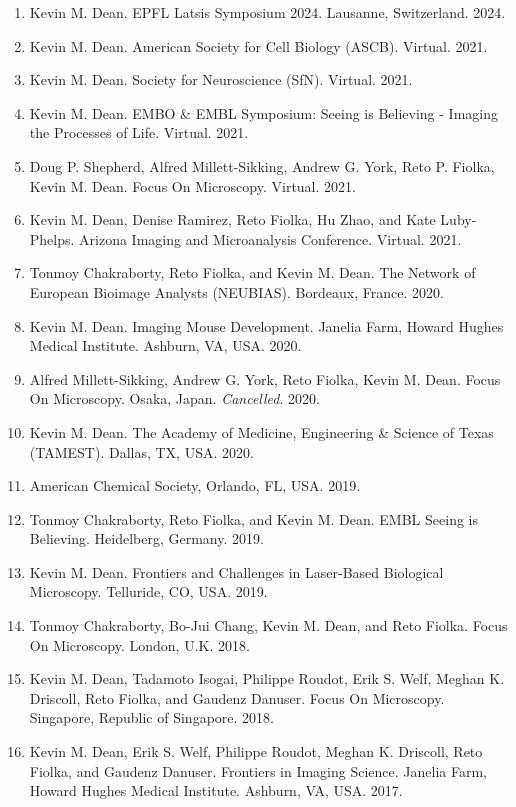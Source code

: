 \begin{enumerate}
\item Kevin M. Dean.  EPFL Latsis Symposium 2024. Lausanne, Switzerland. 2024.
\item Kevin M. Dean.  American Society for Cell Biology (ASCB). Virtual. 2021.
\item Kevin M. Dean.  Society for Neuroscience (SfN). Virtual. 2021.
\item Kevin M. Dean.  EMBO \& EMBL Symposium: Seeing is Believing - Imaging the Processes of Life.  Virtual.  2021.
\item Doug P. Shepherd, Alfred Millett-Sikking, Andrew G. York, Reto P. Fiolka, Kevin M. Dean.  Focus On Microscopy. Virtual. 2021.
\item Kevin M. Dean, Denise Ramirez, Reto Fiolka, Hu Zhao, and Kate Luby-Phelps. Arizona Imaging and Microanalysis Conference. Virtual. 2021.
\item Tonmoy Chakraborty, Reto Fiolka, and Kevin M. Dean.  The Network of European Bioimage Analysts (NEUBIAS).  Bordeaux, France. 2020.
\item Kevin M. Dean.  Imaging Mouse Development.  Janelia Farm, Howard Hughes Medical Institute.  Ashburn, VA, USA. 2020.
\item Alfred Millett-Sikking, Andrew G. York, Reto Fiolka, Kevin M. Dean.  Focus On Microscopy.  Osaka, Japan. {\it Cancelled}. 2020.
\item Kevin M. Dean.  The Academy of Medicine, Engineering \& Science of Texas (TAMEST).  Dallas, TX, USA. 2020.
\item American Chemical Society, Orlando, FL, USA. 2019.
\item Tonmoy Chakraborty, Reto Fiolka, and Kevin M. Dean.  EMBL Seeing is Believing. Heidelberg, Germany. 2019.
\item Kevin M. Dean. Frontiers and Challenges in Laser-Based Biological Microscopy. Telluride, CO, USA. 2019.
\item Tonmoy Chakraborty, Bo-Jui Chang, Kevin M. Dean, and Reto Fiolka.  Focus On Microscopy.  London, U.K.  2018.
\item Kevin M. Dean, Tadamoto Isogai, Philippe Roudot, Erik S. Welf, Meghan K. Driscoll, Reto Fiolka, and Gaudenz Danuser.  Focus On Microscopy.  Singapore, Republic of Singapore. 2018.
\item Kevin M. Dean, Erik S. Welf, Philippe Roudot, Meghan K. Driscoll, Reto Fiolka, and Gaudenz Danuser.  Frontiers in Imaging Science.  Janelia Farm, Howard Hughes Medical Institute.  Ashburn, VA, USA.  2017.

\end{enumerate}
